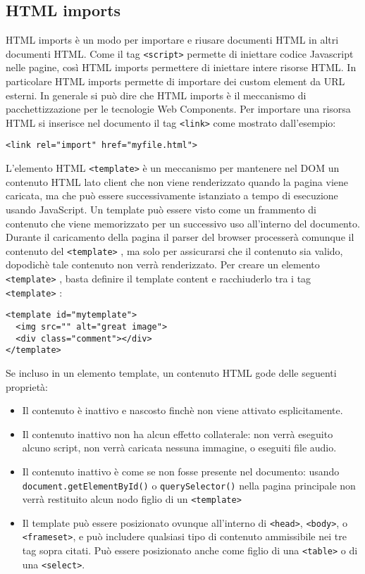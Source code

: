 \subsection{HTML imports}
\label{sec:chapter_tecnologie_abilitanti_html_imports}

HTML imports è un modo per importare e riusare documenti HTML in altri documenti HTML. Come il tag \texttt{<script>} permette di iniettare codice Javascript nelle pagine, così HTML imports permettere di iniettare intere risorse HTML. In particolare HTML imports permette di importare dei custom element da URL esterni. In generale si può dire che HTML imports è il meccanismo di pacchettizzazione per le tecnologie Web Components.
Per importare una risorsa HTML si inserisce nel documento il tag \texttt{<link>} come mostrato dall’esempio:
\begin{lstlisting}[language=HTML5]
<link rel="import" href="myfile.html">
\end{lstlisting}
L’elemento HTML \texttt{<template>} è un meccanismo per mantenere nel DOM un contenuto HTML lato client che non viene renderizzato quando la pagina viene caricata, ma che può essere successivamente istanziato a tempo di esecuzione usando JavaScript. Un template può essere visto come un frammento di contenuto che viene memorizzato per un successivo uso all’interno del documento. Durante il caricamento della pagina il parser del browser processerà comunque il contenuto del \texttt{<template>} , ma solo per assicurarsi che il contenuto sia valido, dopodichè tale contenuto non verrà renderizzato.
Per creare un elemento \texttt{<template>} , basta definire il template content e racchiuderlo tra i tag \texttt{<template>} :
\begin{lstlisting}[language=HTML5]
<template id="mytemplate">
  <img src="" alt="great image">
  <div class="comment"></div>
</template>
\end{lstlisting}
Se incluso in un elemento template, un contenuto HTML gode delle seguenti proprietà: 
\begin{itemize}
\item Il contenuto è inattivo e nascosto finchè non viene attivato esplicitamente.
\item Il contenuto inattivo non ha alcun effetto collaterale: non verrà eseguito alcuno script, non verrà caricata nessuna immagine, o eseguiti file audio.
\item Il contenuto inattivo è come se non fosse presente nel documento: usando \texttt{document.getElementById()} o \texttt{querySelector()} nella pagina principale non verrà restituito alcun nodo figlio di un \texttt{<template>}
\item Il template può essere posizionato ovunque all’interno di \texttt{<head>}, \texttt{<body>}, o \texttt{<frameset>}, e può includere qualsiasi tipo di contenuto ammissibile nei tre tag sopra citati. Può essere posizionato anche come figlio di una \texttt{<table>} o di una \texttt{<select>}. 
\end{itemize}
